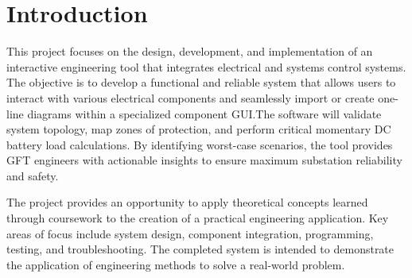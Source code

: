 \documentclass[12pt, letterpaper]{article}
\begin{document}
\section{Introduction}
This project focuses on the design, development, and implementation of an
interactive engineering tool that integrates electrical and systems control
systems. The objective is to develop a functional and reliable system
that allows users to interact with various electrical components and seamlessly import
or create one-line diagrams within a specialized component GUI.The software will validate 
system topology, map zones of protection, and perform critical momentary DC battery load 
calculations. By identifying worst-case scenarios, the tool provides GFT engineers with 
actionable insights to ensure maximum substation reliability and safety.


The project provides an opportunity to apply theoretical concepts learned
through coursework to the creation of a practical engineering application. Key areas of
focus include system design, component integration, programming, testing,
and troubleshooting. The completed system is intended to demonstrate the
application of engineering methods to solve a real-world problem.
\end{document}
